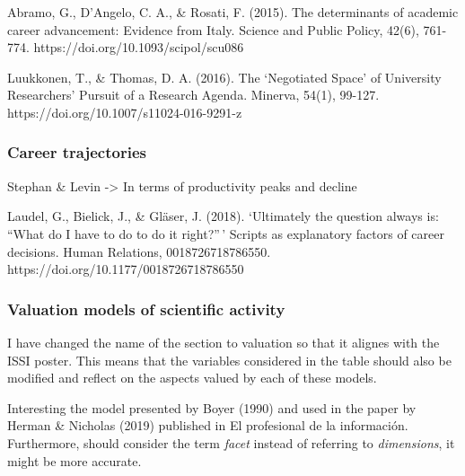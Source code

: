 \documentclass[]{elsarticle} %
\begin{document}
Abramo, G., D'Angelo, C. A., \& Rosati, F. (2015). The determinants of
academic career advancement: Evidence from Italy. Science and Public
Policy, 42(6), 761-774. https://doi.org/10.1093/scipol/scu086

Luukkonen, T., \& Thomas, D. A. (2016). The `Negotiated Space' of
University Researchers' Pursuit of a Research Agenda. Minerva, 54(1),
99-127. https://doi.org/10.1007/s11024-016-9291-z

\hypertarget{career-trajectories}{%
\subsubsection{Career trajectories}\label{career-trajectories}}

Stephan \& Levin -\textgreater{} In terms of productivity peaks and
decline

Laudel, G., Bielick, J., \& Gläser, J. (2018). `Ultimately the question
always is: ``What do I have to do to do it right?''\,' Scripts as
explanatory factors of career decisions. Human Relations,
0018726718786550. https://doi.org/10.1177/0018726718786550

\hypertarget{valuation-models-of-scientific-activity}{%
\subsubsection{Valuation models of scientific
activity}\label{valuation-models-of-scientific-activity}}

I have changed the name of the section to valuation so that it alignes
with the ISSI poster. This means that the variables considered in the
table should also be modified and reflect on the aspects valued by each
of these models.

Interesting the model presented by Boyer (1990) and used in the paper by
Herman \& Nicholas (2019) published in El profesional de la información.
Furthermore, should consider the term \emph{facet} instead of referring
to \emph{dimensions}, it might be more accurate.
\end{document}
